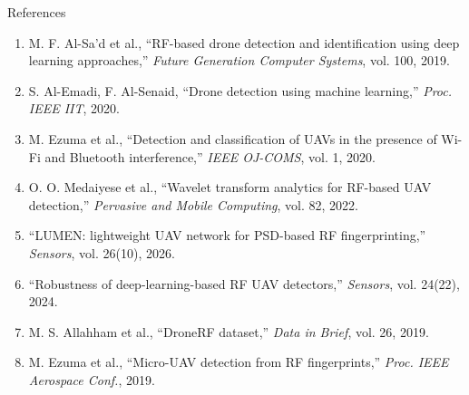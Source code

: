 \documentclass[aspectratio=169,11pt]{beamer}
\begin{document}
\begin{frame}{References}
\scriptsize
\begin{enumerate}
\item M. F. Al-Sa'd et al., ``RF-based drone detection and identification using
deep learning approaches,'' \textit{Future Generation Computer Systems},
vol. 100, 2019.
\item S. Al-Emadi, F. Al-Senaid, ``Drone detection using machine learning,''
\textit{Proc. IEEE IIT}, 2020.
\item M. Ezuma et al., ``Detection and classification of UAVs in the presence of
Wi-Fi and Bluetooth interference,'' \textit{IEEE OJ-COMS}, vol. 1, 2020.
\item O. O. Medaiyese et al., ``Wavelet transform analytics for RF-based UAV
detection,'' \textit{Pervasive and Mobile Computing}, vol. 82, 2022.
\item ``LUMEN: lightweight UAV network for PSD-based RF fingerprinting,''
\textit{Sensors}, vol. 26(10), 2026.
\item ``Robustness of deep-learning-based RF UAV detectors,'' \textit{Sensors},
vol. 24(22), 2024.
\item M. S. Allahham et al., ``DroneRF dataset,'' \textit{Data in Brief},
vol. 26, 2019.
\item M. Ezuma et al., ``Micro-UAV detection from RF fingerprints,''
\textit{Proc. IEEE Aerospace Conf.}, 2019.
\end{enumerate}
\end{frame}
\end{document}
